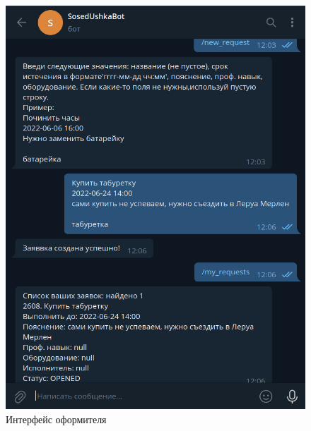 \begin{figure}[H]
	\begin{center}
		\includegraphics[scale=0.3]{assets/customer.png}
	\end{center}
	\caption{Интерфейс оформителя}
	\label{customer}
\end{figure}


